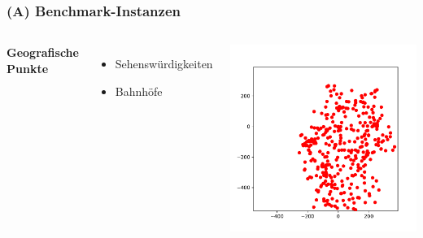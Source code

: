 \documentclass[aspectratio=169]{beamer}
\begin{document}
\begin{frame}
	\frametitle{(A) Benchmark-Instanzen}
	\begin{columns}[c] %
	
	\textbf{Geografische Punkte}
	\begin{itemize}
		\item Sehenswürdigkeiten
		\item Bahnhöfe
	\end{itemize}
	
	\includegraphics[scale=.5]{railway.pdf}
	

	\end{columns}
	\end{frame}

\end{document}
